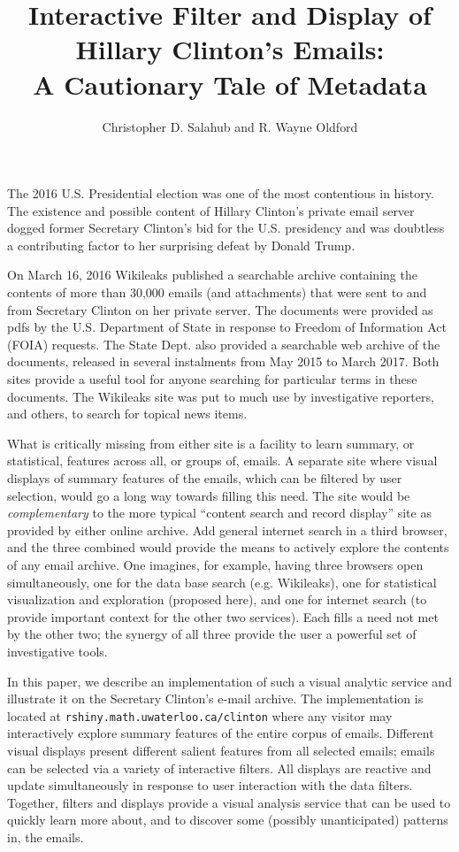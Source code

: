 \documentclass[journal]{vgtc}                %
\title{Interactive Filter and Display of Hillary Clinton's Emails: \\A Cautionary Tale of Metadata}
\author{Christopher D. Salahub and R. Wayne Oldford}
\begin{document}
\maketitle
The 2016 U.S. Presidential election was one of the most contentious in history.  The existence and possible content of Hillary Clinton's private email server dogged former Secretary Clinton's bid for the U.S. presidency and was doubtless a contributing factor to her surprising defeat by Donald Trump.

On March 16, 2016 Wikileaks  published a searchable archive \cite{Wikileaks} containing the contents of more than 30,000 emails (and attachments) that were sent to and from Secretary Clinton on her private server.  The documents were provided as pdfs by the U.S. Department of State in response to Freedom of Information Act (FOIA) \cite{FOIA} requests.  The State Dept. also provided a searchable web archive of the documents, released in several instalments from May 2015 to March 2017\cite{StateDeptFOIA}.   Both sites provide a  useful tool for anyone searching for particular terms in these documents.  The Wikileaks site was put to much use by investigative reporters, and others, to search for topical news items.

What is critically missing from either site is a facility to learn summary, or statistical, features across all, or groups of,  emails.   A separate site where visual displays of summary features of the emails, which can be filtered by user selection, would go a long way towards filling this need.  The site would be \emph{complementary} to the more typical ``content search and record display'' site as provided by either online archive.   Add general internet search in a third browser, and the three combined would provide the means to actively explore the contents of any email archive.    One imagines, for example, having three browsers open simultaneously, one for the data base search (e.g. Wikileaks), one for statistical visualization and exploration (proposed here), and one for internet search (to provide important context for the other two services).  Each fills a need not met by the other two; the synergy of all three provide the user a powerful set of investigative tools.

In this paper, we describe an implementation of such a visual analytic service and illustrate it on the Secretary Clinton's e-mail archive.  The implementation is located at  \texttt{rshiny.math.uwaterloo.ca/clinton} where any visitor may interactively explore summary features  of the entire corpus of emails.   Different visual displays present different salient features from all selected emails; emails can be selected via a variety of interactive filters.   All displays are reactive and update simultaneously in response to user interaction with the data filters.  Together, filters and displays provide a visual analysis service that can be used to quickly learn more about, and to discover some (possibly unanticipated) patterns in, the emails. 
\end{document}
